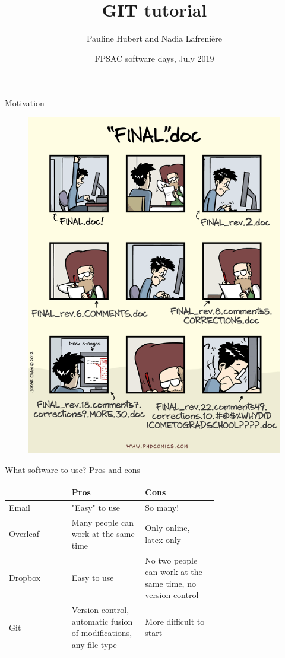 \documentclass{beamer}
\title{GIT tutorial}
\author{Pauline Hubert and Nadia Lafrenière}
\date{FPSAC software days, July 2019}
\begin{document}
	\maketitle
	\begin{frame}{Motivation}
		\begin{figure}[h]
			\centering
			\includegraphics[scale=.28]{phd101212s.png}
		\end{figure}
	\end{frame}

	\begin{frame}{What software to use? Pros and cons}
		\begin{tabular}{lp{0.35\linewidth}p{0.35\linewidth}}
			& Pros & Cons\\
			\hline
			Email & "Easy" to use & So many!\\
			\hline
			Overleaf & Many people can work at the same time & Only online, latex only\\
			\hline
			Dropbox & Easy to use & No two people can work at the same time, no version control\\
			\hline
			Git & Version control, automatic fusion of modifications, any file type & More difficult to start\\
		\end{tabular}
	\end{frame}
\end{document}

